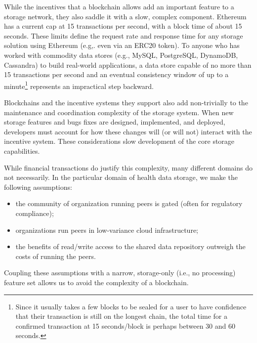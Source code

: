 \documentclass[10pt]{article}
\begin{document}
While the incentives that a blockchain allows add an important feature to a storage network, they also saddle it with a slow, complex component. Ethereum has a current cap at 15 transactions per second, with a block time of about 15 seconds. These limits define the request rate and response time for any storage solution using Ethereum (e.g,. even via an ERC20 token). To anyone who has worked with commodity data stores (e.g., MySQL, PostgreSQL, DynamoDB, Cassandra) to build real-world applications, a data store capable of no more than 15 transactions per second and an eventual consistency window of up to a minute\footnote{Since it usually takes a few blocks to be sealed for a user to have confidence that their transaction is still on the longest chain, the total time for a confirmed transaction at 15 seconds/block is perhaps between 30 and 60 seconds.} represents an impractical step backward.

Blockchains and the incentive systems they support also add non-trivially to the maintenance and coordination complexity of the storage system. When new storage features and bugs fixes are designed, implemented, and deployed, developers must account for how these changes will (or will not) interact with the incentive system. These considerations slow development of the core storage capabilities. 

While financial transactions do justify this complexity, many different domains do not necessarily. In the particular domain of health data storage, we make the following assumptions:
\begin{itemize}
	\item the community of organization running peers is gated (often for regulatory compliance);
	\item organizations run peers in low-variance cloud infrastructure;
	\item the benefits of read/write access to the shared data repository outweigh the costs of running the peers.
\end{itemize}
Coupling these assumptions with a narrow, storage-only (i.e., no processing) feature set allows us to avoid the complexity of a blockchain.
\end{document}
